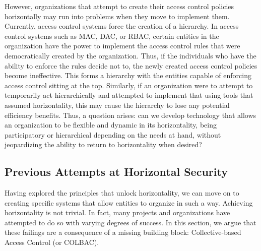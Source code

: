 However, organizations that attempt to create their access control policies
horizontally may run into problems when they move to implement them. Currently,
access control systems force the creation of a hierarchy. In access control
systems such as MAC, DAC, or RBAC, certain entities in the organization have the
power to implement the access control rules that were democratically created by
the organization. Thus, if the individuals who have the ability to enforce the
rules decide not to, the newly created access control policies become
ineffective. This forms a hierarchy with the entities capable of enforcing
access control sitting at the top. Similarly, if an organization were to attempt
to temporarily act hierarchically and attempted to implement that using tools
that assumed horizontality, this may cause the hierarchy to lose any potential
efficiency benefits. Thus, a question arises: can we develop technology that
allows an organization to be flexible and dynamic in its horizontality, being
participatory or hierarchical depending on the needs at hand, without
jeopardizing the ability to return to horizontality when desired?

\subsection{Previous Attempts at Horizontal Security}
Having explored the principles that unlock horizontality, we can move on to
creating specific systems that allow entities to organize in such a way.
Achieving horizontality is not trivial. In fact, many projects and
organizations have attempted to do so with varying degrees of success. In this
section, we argue that these failings are a consequence of a missing building
block: Collective-based Access Control (or COLBAC).


